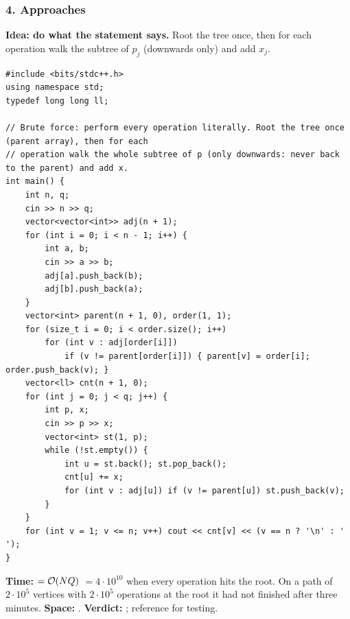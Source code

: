 \subsubsection*{4. Approaches}

\begin{bruteforcebox}
\textbf{Idea: do what the statement says.} Root the tree once, then for each operation walk the subtree of $p_j$ (downwards only) and add $x_j$.

\begin{lstlisting}[style=cpp]
#include <bits/stdc++.h>
using namespace std;
typedef long long ll;

// Brute force: perform every operation literally. Root the tree once (parent array), then for each
// operation walk the whole subtree of p (only downwards: never back to the parent) and add x.
int main() {
    int n, q;
    cin >> n >> q;
    vector<vector<int>> adj(n + 1);
    for (int i = 0; i < n - 1; i++) {
        int a, b;
        cin >> a >> b;
        adj[a].push_back(b);
        adj[b].push_back(a);
    }
    vector<int> parent(n + 1, 0), order(1, 1);
    for (size_t i = 0; i < order.size(); i++)
        for (int v : adj[order[i]])
            if (v != parent[order[i]]) { parent[v] = order[i]; order.push_back(v); }
    vector<ll> cnt(n + 1, 0);
    for (int j = 0; j < q; j++) {
        int p, x;
        cin >> p >> x;
        vector<int> st(1, p);
        while (!st.empty()) {
            int u = st.back(); st.pop_back();
            cnt[u] += x;
            for (int v : adj[u]) if (v != parent[u]) st.push_back(v);
        }
    }
    for (int v = 1; v <= n; v++) cout << cnt[v] << (v == n ? '\n' : ' ');
}
\end{lstlisting}

\begin{complexitybox}
\textbf{Time:}  $= \mathcal{O}(NQ)$ $= 4\cdot10^{10}$ when every operation hits the root. On a path of $2\cdot10^5$ vertices with $2\cdot10^5$ operations at the root it had not finished after three minutes. \textbf{Space:} . \textbf{Verdict:} \tle; reference for testing.
\end{complexitybox}
\end{bruteforcebox}

